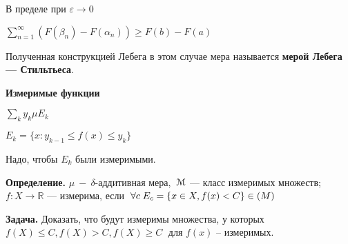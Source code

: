 В пределе при $\varepsilon \rightarrow 0$

$\sum_{n=1}^{\infty} (F(\beta_n) - F(\alpha_n)) \geqslant F(b) -
F(a)$






Полученная конструкцией Лебега в этом случае мера называется
\textbf{мерой Лебега --- Стильтьеса}.

\begin{center}
\textbf{Измеримые функции}
\end{center}


%
%
%
%
%

$\sum_{k} y_k \mu E_k$

$E_k = \{x: y_{k-1} \leqslant f(x) \leqslant y_k\}$

Надо, чтобы $E_k$ были измеримыми.

\textbf{Определение.} \quad $\mu \:-\:  \delta$-аддитивная мера,
$\: \EuScript{M}$ --- класс измеримых множеств; $f: X \rightarrow
\mathbb{R}$ --- измерима, если $\: \forall c \; E_c = \{ x \in X,
f(x) < C\} \in \EuScript(M)$

\textbf{Задача.} \quad Доказать, что будут измеримы множества, у
которых $f(X) \leqslant C, f(X) > C, f(X) \geqslant C\;$ для
$f(x)$ -- измеримых.
